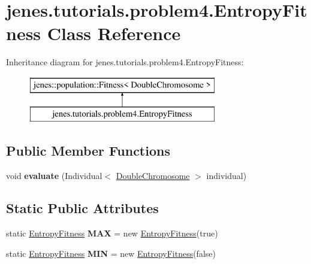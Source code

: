 \hypertarget{classjenes_1_1tutorials_1_1problem4_1_1_entropy_fitness}{\section{jenes.\-tutorials.\-problem4.\-Entropy\-Fitness Class Reference}
\label{classjenes_1_1tutorials_1_1problem4_1_1_entropy_fitness}
}
Inheritance diagram for jenes.\-tutorials.\-problem4.\-Entropy\-Fitness\-:\begin{figure}[H]
\begin{center}
\leavevmode
\includegraphics[height=2.000000cm]{classjenes_1_1tutorials_1_1problem4_1_1_entropy_fitness}
\end{center}
\end{figure}
\subsection*{Public Member Functions}
\begin{DoxyCompactItemize}
\item 
\hypertarget{classjenes_1_1tutorials_1_1problem4_1_1_entropy_fitness_a0e101073e060b84386ee2c10eb80a2f0}{void {\bfseries evaluate} (Individual$<$ \hyperlink{classjenes_1_1chromosome_1_1_double_chromosome}{Double\-Chromosome} $>$ individual)}\label{classjenes_1_1tutorials_1_1problem4_1_1_entropy_fitness_a0e101073e060b84386ee2c10eb80a2f0}

\end{DoxyCompactItemize}
\subsection*{Static Public Attributes}
\begin{DoxyCompactItemize}
\item 
\hypertarget{classjenes_1_1tutorials_1_1problem4_1_1_entropy_fitness_a015b775a1b2b1f1d5bc1eb82a560fe9a}{static \hyperlink{classjenes_1_1tutorials_1_1problem4_1_1_entropy_fitness}{Entropy\-Fitness} {\bfseries M\-A\-X} = new \hyperlink{classjenes_1_1tutorials_1_1problem4_1_1_entropy_fitness}{Entropy\-Fitness}(true)}\label{classjenes_1_1tutorials_1_1problem4_1_1_entropy_fitness_a015b775a1b2b1f1d5bc1eb82a560fe9a}

\item 
\hypertarget{classjenes_1_1tutorials_1_1problem4_1_1_entropy_fitness_ab9c1db9f5da22216604985e98b6fc7e4}{static \hyperlink{classjenes_1_1tutorials_1_1problem4_1_1_entropy_fitness}{Entropy\-Fitness} {\bfseries M\-I\-N} = new \hyperlink{classjenes_1_1tutorials_1_1problem4_1_1_entropy_fitness}{Entropy\-Fitness}(false)}\label{classjenes_1_1tutorials_1_1problem4_1_1_entropy_fitness_ab9c1db9f5da22216604985e98b6fc7e4}

\end{DoxyCompactItemize}


